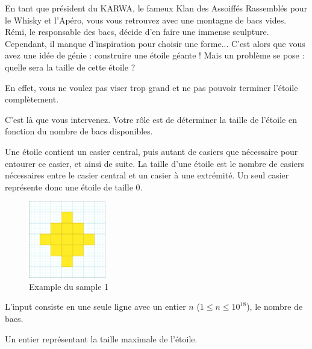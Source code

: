 \problemname{}


En tant que président du KARWA, le fameux Klan des Assoiffés Rassemblés pour le Whisky et l'Apéro, vous vous retrouvez avec une montagne de bacs vides. Rémi, le responsable des bacs, décide d'en faire une immense sculpture. Cependant, il manque d'inspiration pour choisir une forme... 
C'est alors que vous avez une idée de génie : construire une étoile géante ! Mais un problème se pose : quelle sera la taille de cette étoile ?

En effet, vous ne voulez pas viser trop grand et ne pas pouvoir terminer l'étoile complètement.

C'est là que vous intervenez. Votre rôle est de déterminer la taille de l'étoile en fonction du nombre de bacs disponibles.

Une étoile contient un casier central, puis autant de casiers que nécessaire pour entourer ce casier, et ainsi de suite. La taille d'une étoile est le nombre de casiers nécessaires entre le casier central et un casier à une extrémité. Un seul casier représente donc une étoile de taille $0$.

\smallskip
\begin{figure}[h]
    \centering
    \includegraphics[width=0.3\textwidth]{example.png}
    \caption{Example du sample 1}
\end{figure}

\begin{Input}
    L'input consiste en une seule ligne avec un entier $n$ ($1 \leq n \leq 10^{18}$), le nombre de bacs.
\end{Input}

\begin{Output}
    Un entier représentant la taille maximale de l'étoile.
\end{Output}
